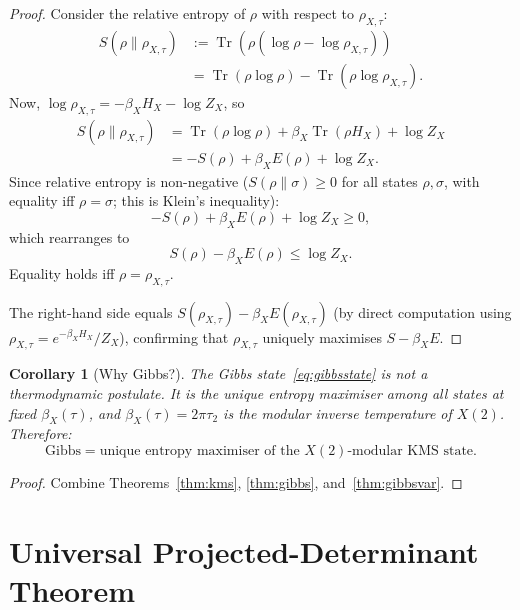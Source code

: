 \documentclass[12pt]{article}
\theoremstyle{plain}
\newtheorem{corollary}[theorem]{Corollary}
\theoremstyle{definition}
\numberwithin{equation}{section}
\DeclareMathOperator{\Tr}{Tr}
\begin{document}
\begin{proof}
Consider the relative entropy of $\rho$ with respect to
$\rho_{X,\tau}$:
\begin{align}
S(\rho\|\rho_{X,\tau})
&:= \Tr\!\left(\rho\!\left(\log\rho-\log\rho_{X,\tau}\right)\right)\\
&= \Tr\!\left(\rho\log\rho\right)
- \Tr\!\left(\rho\log\rho_{X,\tau}\right).
\end{align}
Now, $\log\rho_{X,\tau}=-\beta_X H_X-\log Z_X$, so
\begin{align}
S(\rho\|\rho_{X,\tau})
&= \Tr(\rho\log\rho)+\beta_X\Tr(\rho H_X)+\log Z_X\\
&= -S(\rho)+\beta_X E(\rho)+\log Z_X.
\end{align}
Since relative entropy is non-negative
($S(\rho\|\sigma)\geq 0$ for all states $\rho,\sigma$, with equality
iff $\rho=\sigma$; this is Klein's inequality):
\begin{equation}
-S(\rho)+\beta_X E(\rho)+\log Z_X \geq 0,
\end{equation}
which rearranges to
\begin{equation}
S(\rho)-\beta_X E(\rho) \leq \log Z_X.
\end{equation}
Equality holds iff $\rho=\rho_{X,\tau}$.

The right-hand side equals $S(\rho_{X,\tau})-\beta_X E(\rho_{X,\tau})$
(by direct computation using $\rho_{X,\tau}=e^{-\beta_X H_X}/Z_X$),
confirming that $\rho_{X,\tau}$ uniquely maximises $S-\beta_X E$.
\end{proof}

\begin{corollary}[Why Gibbs?]
The Gibbs state~\eqref{eq:gibbsstate} is not a thermodynamic postulate.
It is the unique entropy maximiser among all states at fixed
$\beta_X(\tau)$, and $\beta_X(\tau)=2\pi\tau_2$ is the modular inverse
temperature of $X(2)$.  Therefore:
\begin{equation}
\boxed{\text{Gibbs} = \text{unique entropy maximiser of the }X(2)\text{-modular KMS state.}}
\end{equation}
\end{corollary}

\begin{proof}
Combine Theorems~\ref{thm:kms}, \ref{thm:gibbs}, and~\ref{thm:gibbsvar}.
\end{proof}


\part{Universal Projected-Determinant Theorem}
\end{document}

